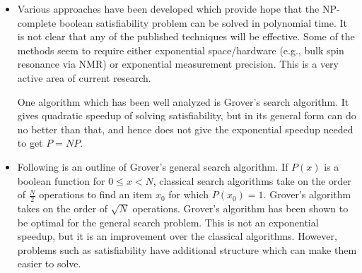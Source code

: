 \documentclass{article}
\begin{document}
\begin{itemize}
\item Various approaches have been developed which provide hope that the NP-complete boolean satisfiability problem can be solved in polynomial time.  It is not clear that any of the published techniques will be effective.  Some of the methods seem to require either exponential space/hardware (e.g., bulk spin resonance via NMR) or exponential measurement precision.  This is a very active area of current research.

One algorithm which has been well analyzed is Grover's search algorithm.  It gives quadratic speedup of solving satisfiability, but in its general form can do no better than that, and hence does not give the exponential speedup needed to get $P=NP$.

\item Following is an outline of Grover's general search algorithm.  If $P(x)$ is a boolean function for $0 \le x < N$, classical search algorithms take on the order of $\frac{N}{2}$ operations to find an item $x_0$ for which $P(x_0) = 1$.  Grover's algorithm takes on the order of $\sqrt{N}$ operations.  Grover's algorithm has been shown to be optimal for the general search problem.  This is not an exponential speedup, but it is an improvement over the classical algorithms.  However, problems such as satisfiability have additional structure which can make them easier to solve.


\end{itemize}
\end{document}
